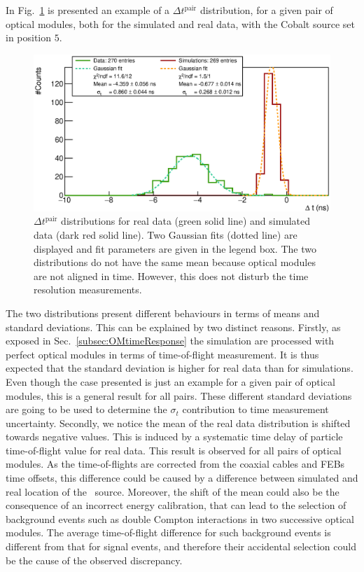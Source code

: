 In Fig.~\ref{fig:Co_deltat} is presented an example of a $\Delta t^{\text{pair}}$ distribution, for a given pair of optical modules, both for the simulated and real data, with the Cobalt source set in position $5$.
\begin{figure}[h]
  \centering
  \includegraphics[width=15cm]{commissioning/fig_commissioning/Co_deltat_distrib_ex.eps}
  \caption{$\Delta t^{\text{pair}}$ distributions for real data (green solid line) and simulated data (dark red solid line).
    Two Gaussian fits (dotted line) are displayed and fit parameters are given in the legend box.
    The two distributions do not have the same mean because optical modules are not aligned in time.
    However, this does not disturb the time resolution measurements.
    \label{fig:Co_deltat}}
\end{figure}
The two distributions present different behaviours in terms of means and standard deviations.
This can be explained by two distinct reasons.
Firstly, as exposed in Sec.~\ref{subsec:OMtimeResponse} the simulation are processed with perfect optical modules in terms of time-of-flight measurement.
It is thus expected that the standard deviation is higher for real data than for simulations.
Even though the case presented is just an example for a given pair of optical modules, this is a general result for all pairs.
These different standard deviations are going to be used to determine the $\sigma_{t}$ contribution to time measurement uncertainty.
Secondly, we notice the mean of the real data distribution is shifted towards negative values.
This is induced by a systematic time delay of particle time-of-flight value for real data.
This result is observed for all pairs of optical modules.
As the time-of-flights are corrected from the coaxial cables and FEBs time offsets, this difference could be caused by a difference between simulated and real location of the \Co\ source.
Moreover, the shift of the mean could also be the consequence of an incorrect energy calibration, that can lead to the selection of background events such as double Compton interactions in two successive optical modules.
The average time-of-flight difference for such background events is different from that for signal events, and therefore their accidental selection could be the cause of the observed discrepancy.

